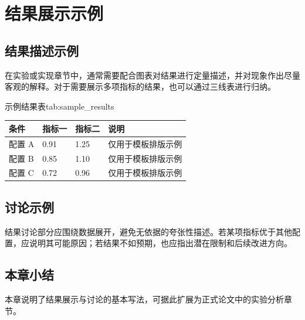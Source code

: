 \chapter{结果展示示例}

\section{结果描述示例}

在实验或实现章节中，通常需要配合图表对结果进行定量描述，并对现象作出尽量客观的解释。对于需要展示多项指标的结果，也可以通过三线表进行归纳。

\begin{bupttable}{示例结果表}{tab:sample_results}
    \begin{tabular}{@{}p{2.8cm} p{2.8cm} p{2.8cm} p{3.6cm}@{}}
        \toprule
        条件 & 指标一 & 指标二 & 说明 \\
        \midrule
        配置 A & 0.91 & 1.25 & 仅用于模板排版示例 \\
        配置 B & 0.85 & 1.10 & 仅用于模板排版示例 \\
        配置 C & 0.72 & 0.96 & 仅用于模板排版示例 \\
        \bottomrule
    \end{tabular}
\end{bupttable}

\section{讨论示例}

结果讨论部分应围绕数据展开，避免无依据的夸张性描述。若某项指标优于其他配置，应说明其可能原因；若结果不如预期，也应指出潜在限制和后续改进方向。

\section{本章小结}

本章说明了结果展示与讨论的基本写法，可据此扩展为正式论文中的实验分析章节。
